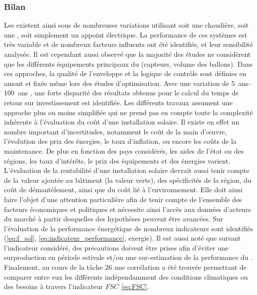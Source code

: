 \subsubsection{Bilan} %
\label{ssub:bilan_travaux}
Les  existent ainsi sous de nombreuses variations utilisant soit une chaudière,
soit une , soit simplement un appoint électrique. La performance de ces systèmes
est très variable et de nombreux facteurs influents ont été identifiés, et leur
sensibilité analysée. Il est cependant aussi observé que la majorité des études ne
considèrent que les différents équipements principaux du  (capteurs, volume des
ballons). Dans ces approches, la qualité de l’enveloppe et la logique de contrôle sont
définies en amont et fixée même lors des études d’optimisation. Avec une variation de \SIrange{5}{100}{ans}
\parencite{Tsalikis2015743,Hin2014102}, une forte disparité des résultats obtenus pour le
calcul du temps de retour sur investissement est identifiée. Les différents travaux
assument une approche plus ou moins simplifiée qui ne prend pas en compte toute
la complexité inhérente à l’évaluation du coût d’une installation solaire. Il existe en
effet un nombre important d’incertitudes, notamment le coût de la main
d’œuvre, l’évolution des prix des énergies, le taux d’inflation, ou encore les coûts de la
maintenance. De plus en fonction des pays considérés, les aides de l’état ou des régions,
les taux d’intérêts, le prix des équipements et des énergies varient. L’évaluation de la
rentabilité d’une installation solaire devrait aussi tenir compte de la valeur ajoutée au
bâtiment (la valeur verte), des spécificités de la région, du coût de démantèlement, ainsi
que du coût lié à l’environnement. Elle doit ainsi faire l’objet
d’une attention particulière afin de tenir compte de
l’ensemble des facteurs économiques et politiques et nécessite ainsi l’accès aux données
d’acteurs du marché à partir desquelles des hypothèses peuvent être avancées. Sur
l’évaluation de la performance énergétique de nombreux indicateurs sont identifiés
(\eqref{eq:f_sol}, \eqref{eq:indicateur_performance}, exergie). Il est aussi noté que
suivant l’indicateur considéré, des précautions doivent être prises afin d’éviter une
surproduction en période estivale et/ou une sur-estimation de la performance du .
Finalement, au cours de la tâche $26$ une corrélation a
été trouvée permettant de comparer entre eux les différents  indépendamment des
conditions climatiques ou des besoins à travers l’indicateur $FSC$ \eqref{eq:FSC}.

